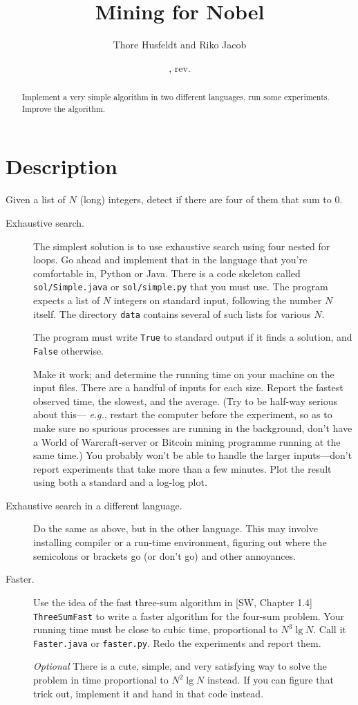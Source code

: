 \documentclass{tufte-handout}
\title{Mining for Nobel}
\author{Thore Husfeldt and Riko Jacob}
\date{\GITAuthorDate, rev. \GITAbrHash}
\begin{document}
\maketitle
\begin{abstract}
  Implement a very simple algorithm in two different languages, run some experiments.
  Improve the algorithm.
\end{abstract}


 \section{Description}

 Given a list of $N$ (long) integers, detect if there are four of them that sum to $0$.

\begin{description}
  \item[Exhaustive search.]
The simplest solution is to use exhaustive search using four nested for loops.
Go ahead and implement that in the language that you’re comfortable in, Python or Java.
There is a code skeleton called \texttt{sol/Simple.java} or \texttt{sol/simple.py} that you must use.
The program expects a list of $N$ integers on standard input, following the number $N$ itself.
The directory \texttt{data} contains several of such lists for various $N$.

The program must write \texttt{True} to standard output if it finds a solution, and \texttt{False} otherwise.

Make it work; and determine the running time on your machine on the input files. 
There are a handful of inputs for each size.
Report the fastest observed time, the slowest, and the average.
(Try to be half-way serious about this--- \emph{e.g.}, restart the computer before the experiment, so as to make sure no spurious processes are running in the background, don’t have a World of Warcraft-server or Bitcoin mining programme running at the same time.)
You probably won’t be able to handle the larger inputs---don’t report experiments that take more than a few minutes.
Plot the result using both a standard and a log-log plot.

\item[Exhaustive search in a different language.]
  Do the same as above, but in the other language.
  This may involve installing compiler or a run-time environment, figuring out where the semicolons or brackets go (or don’t go) and other annoyances.

\item[Faster.]
  Use the idea of the fast three-sum algorithm in [SW, Chapter 1.4] \texttt{
  ThreeSumFast} to write a faster algorithm for the four-sum problem.
  Your running time must be close to cubic time, proportional to $N^3\operatorname{lg} N$.
  Call it \texttt{Faster.java}  or \texttt{faster.py}.
  Redo the experiments and report them.

  \emph{Optional} There is a cute, simple, and very satisfying way to solve the problem in time proportional to $N^2\operatorname{lg} N$ instead.
If you can figure that trick out, implement it and hand in that code instead.
\end{description}
\end{document}
